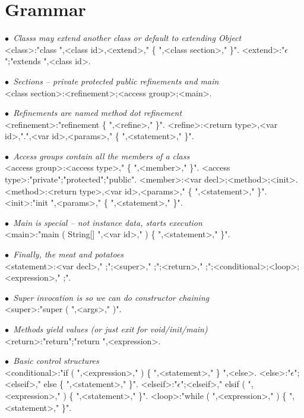 \newcommand{\comment}[1]{{\escapegrammar$\bullet$\it\ #1}\\}

\section{Grammar}

\begin{grammar}

\comment{Classs may extend another class or default to extending Object}
<class>:"class ",<class id>,<extend>," \{ ",<class section>,"{\small *} \}".
<extend>:"$\epsilon$";"extends ",<class id>.

\comment{Sections -- private protected public refinements and main}
<class section>:<refinement>;<access group>;<main>.

\comment{Refinements are named method dot refinement}
<refinement>:"refinement \{ ",<refine>,"{\small *} \}".
<refine>:<return type>,<var id>,".",<var id>,<params>," \{ ",<statement>,"{\small *} \}".

\comment{Access groups contain all the members of a class}
<access group>:<access type>," \{ ",<member>,"{\small *} \}".
<access type>:"private";"protected";"public".
<member>:<var decl>;<method>;<init>.
<method>:<return type>,<var id>,<params>," \{ ",<statement>,"{\small *} \}".
<init>:"init ",<params>," \{ ",<statement>,"{\small *} \}".

\comment{Main is special -- not instance data, starts execution}
<main>:"main ( String[] ",<var id>," ) \{ ",<statement>,"{\small *} \}".

\comment{Finally, the meat and potatoes}
<statement>:<var decl>," ;";<super>," ;";<return>," ;";<conditional>;<loop>;<expression>," ;".

\comment{Super invocation is so we can do constructor chaining}
<super>:"super ( ",<args>," )".

\comment{Methods yield values (or just exit for void/init/main)}
<return>:"return";"return ",<expression>.

\comment{Basic control structures}
<conditional>:"if ( ",<expression>," ) \{ ",<statement>,"{\small *} \} ",<else>.
<else>:"$\epsilon$";<elseif>," else \{ ",<statement>,"{\small *} \}".
<elseif>:"$\epsilon$";<elseif>," elsif ( ",<expression>," ) \{ ",<statement>,"{\small *} \}".
<loop>:"while ( ",<expression>," ) \{ ",<statement>,"{\small *} \}".


\end{grammar}
